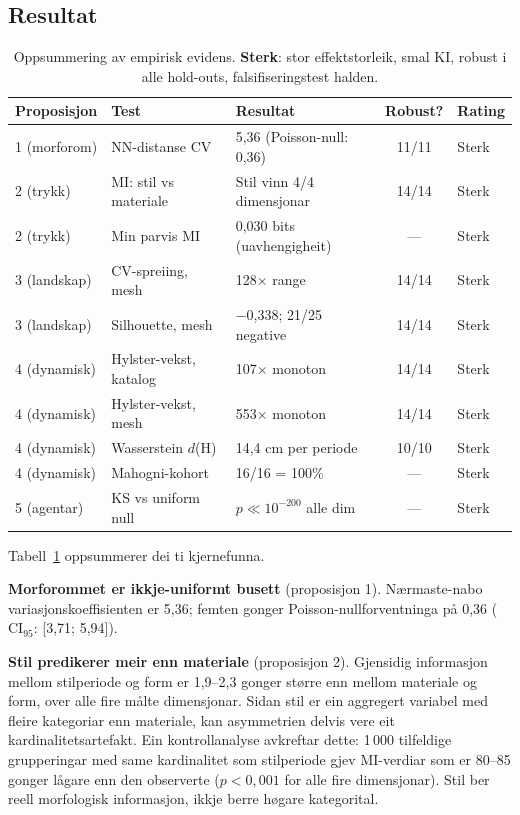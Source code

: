 \subsection{Resultat}

\begin{table}[!t]
\centering
\caption{Oppsummering av empirisk evidens. \textbf{Sterk}: stor effektstorleik, smal KI, robust i alle hold-outs, falsifiseringstest halden.}
\label{tab:evidence}
\small
\begin{tabularx}{\textwidth}{@{} >{\raggedright}p{} >{\raggedright}p{} >{\raggedright}p{} c >{\raggedright\arraybackslash}p{} @{}}
\toprule
\textbf{Proposisjon} & \textbf{Test} & \textbf{Resultat} & \textbf{Robust?} & \textbf{Rating} \\
\midrule
1 (morforom) & NN-distanse CV & 5,36 (Poisson-null: 0,36) & 11/11 & Sterk \\[2pt]
2 (trykk) & MI: stil vs materiale & Stil vinn 4/4 dimensjonar & 14/14 & Sterk \\[2pt]
2 (trykk) & Min parvis MI & 0,030 bits (uavhengigheit) & --- & Sterk \\[2pt]
3 (landskap) & CV-spreiing, mesh & 128$\times$ range & 14/14 & Sterk \\[2pt]
3 (landskap) & Silhouette, mesh & $-$0,338; 21/25 negative & 14/14 & Sterk \\[2pt]
4 (dynamisk) & Hylster-vekst, katalog & 107$\times$ monoton & 14/14 & Sterk \\[2pt]
4 (dynamisk) & Hylster-vekst, mesh & 553$\times$ monoton & 14/14 & Sterk \\[2pt]
4 (dynamisk) & Wasserstein $d$(H) & 14,4 cm per periode & 10/10 & Sterk \\[2pt]
4 (dynamisk) & Mahogni-kohort & 16/16 = 100\% & --- & Sterk \\[2pt]
5 (agentar) & KS vs uniform null & $p \ll 10^{-200}$ alle dim & --- & Sterk \\
\bottomrule
\end{tabularx}
\end{table}

Tabell~\ref{tab:evidence} oppsummerer dei ti kjernefunna.

\textbf{Morforommet er ikkje-uniformt busett} (proposisjon 1). Nærmaste-nabo variasjonskoeffisienten er 5,36; femten gonger Poisson-nullforventninga på 0,36 ($\mathrm{CI}_{95}$: [3,71; 5,94]).

\textbf{Stil predikerer meir enn materiale} (proposisjon 2). Gjensidig informasjon mellom stilperiode og form er 1,9--2,3 gonger større enn mellom materiale og form, over alle fire målte dimensjonar. Sidan stil er ein aggregert variabel med fleire kategoriar enn materiale, kan asymmetrien delvis vere eit kardinalitetsartefakt. Ein kontrollanalyse avkreftar dette: 1\,000 tilfeldige grupperingar med same kardinalitet som stilperiode gjev MI-verdiar som er 80--85 gonger lågare enn den observerte ($p < 0{,}001$ for alle fire dimensjonar). Stil ber reell morfologisk informasjon, ikkje berre høgare kategorital.

